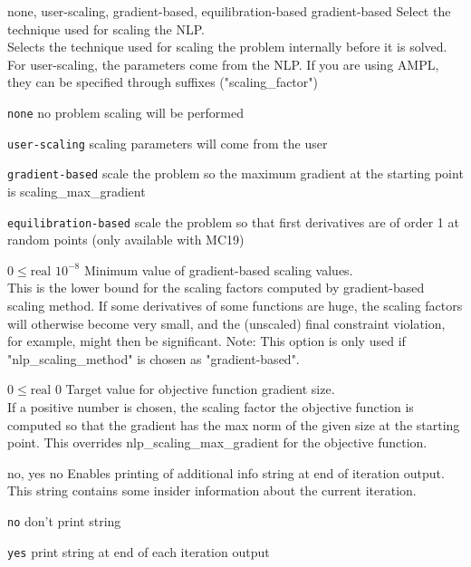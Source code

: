 %
{\ttfamily none, user-scaling, gradient-based, equilibration-based}%
{gradient-based}%
{Select the technique used for scaling the NLP.\\
Selects the technique used for scaling the problem internally before it is solved. For user-scaling, the parameters come from the NLP. If you are using AMPL, they can be specified through suffixes ("scaling\_factor")}%
{\begin{list}{}{
\setlength{\parsep}{0em}
\setlength{\leftmargin}{5ex}
\setlength{\labelwidth}{2ex}
\setlength{\itemindent}{0ex}
\setlength{\topsep}{0pt}}
\item[\texttt{none}] no problem scaling will be performed
\item[\texttt{user-scaling}] scaling parameters will come from the user
\item[\texttt{gradient-based}] scale the problem so the maximum gradient at the starting point is scaling\_max\_gradient
\item[\texttt{equilibration-based}] scale the problem so that first derivatives are of order 1 at random points (only available with MC19)
\end{list}
}

%
{$0\leq\textrm{real}$}%
{$10^{- 8}$}%
{Minimum value of gradient-based scaling values.\\
This is the lower bound for the scaling factors computed by gradient-based scaling method.  If some derivatives of some functions are huge, the scaling factors will otherwise become very small, and the (unscaled) final constraint violation, for example, might then be significant.  Note: This option is only used if "nlp\_scaling\_method" is chosen as "gradient-based".}%
{}

%
{$0\leq\textrm{real}$}%
{$0$}%
{Target value for objective function gradient size.\\
If a positive number is chosen, the scaling factor the objective function is computed so that the gradient has the max norm of the given size at the starting point.  This overrides nlp\_scaling\_max\_gradient for the objective function.}%
{}

%
{\ttfamily no, yes}%
{no}%
{Enables printing of additional info string at end of iteration output.\\
This string contains some insider information about the current iteration.}%
{\begin{list}{}{
\setlength{\parsep}{0em}
\setlength{\leftmargin}{5ex}
\setlength{\labelwidth}{2ex}
\setlength{\itemindent}{0ex}
\setlength{\topsep}{0pt}}
\item[\texttt{no}] don't print string
\item[\texttt{yes}] print string at end of each iteration output
\end{list}
}

